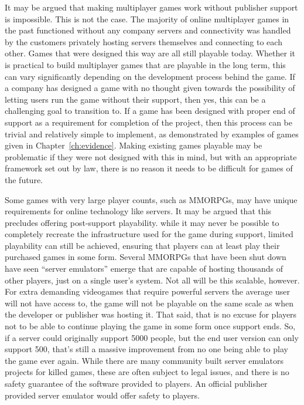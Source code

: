It may be argued that making multiplayer games work without publisher support is impossible.
This is not the case.
The majority of online multiplayer games in the past functioned without any company servers
and connectivity was handled by the customers privately hosting servers themselves and connecting to each other.
Games that were designed this way are all still playable today.
Whether it is practical to build multiplayer games that are playable in the long term, this can vary significantly depending on the development process behind the game.
If a company has designed a game with no thought given towards the possibility of letting users run the game without their support, then yes,
this can be a challenging goal to transition to.
If a game has been designed with proper end of support as a requirement for completion of the project, then this process can be trivial and relatively simple to implement,
as demonstrated by examples of games given in Chapter~\ref{ch:evidence}.
Making existing games playable may be problematic if they were not designed with this in mind,
but with an appropriate framework set out by law, there is no reason it needs to be difficult for games of the future.

Some games with very large player counts, such as MMORPGs, may have unique requirements for online technology like servers.
It may be argued that this precludes offering post-support playability.
while it may never be possible to completely recreate the infrastructure used for the game during support,
limited playability can still be achieved, ensuring that players can at least play their purchased games in some form.
Several MMORPGs that have been shut down have seen ``server emulators'' emerge that are capable of hosting thousands of other players, just on a single user's system.
Not all will be this scalable, however.
For extra demanding videogames that require powerful servers the average user will not have access to,
the game will not be playable on the same scale as when the developer or publisher was hosting it.
That said, that is no excuse for players not to be able to continue playing the game in some form once support ends.
So, if a server could originally support 5000 people, but the end user version can only support 500,
that's still a massive improvement from no one being able to play the game ever again.
While there are many community built server emulators projects for killed games\cite{emulator-list-2022},
these are often subject to legal issues, and there is no safety guarantee of the software provided to players.
An official publisher provided server emulator would offer safety to players.

